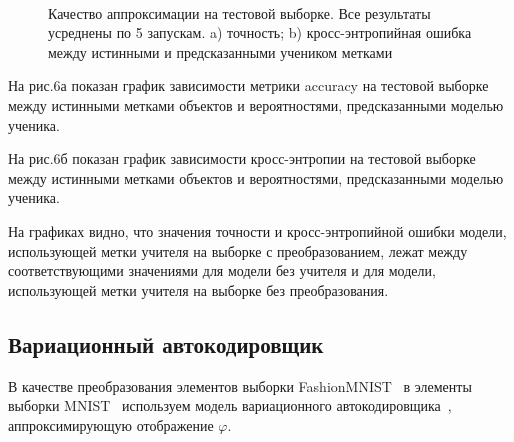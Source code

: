 \begin{figure}[h!t]\center
{}
\\
\caption{Качество аппроксимации на тестовой выборке. Все результаты усреднены по 5 запускам. a) точность; b) кросс-энтропийная ошибка между истинными и предсказанными учеником метками}
\end{figure}

На рис.6а показан график зависимости метрики accuracy на тестовой выборке между истинными метками объектов и вероятностями, предсказанными моделью ученика.

На рис.6б показан график зависимости кросс-энтропии на тестовой выборке между истинными метками объектов и вероятностями, предсказанными моделью ученика.

На графиках видно, что значения точности и кросс-энтропийной ошибки модели, использующей метки учителя на выборке с преобразованием, лежат между соответствующими значениями для модели без учителя и для модели, использующей метки учителя на выборке без преобразования.

\subsection{Вариационный автокодировщик}

В качестве преобразования элементов выборки FashionMNIST~\cite{FMNIST} в элементы выборки MNIST~\cite{MNIST} используем модель вариационного автокодировщика~\cite{VAE}, аппроксимирующую отображение $\varphi$.
